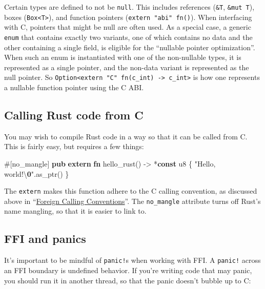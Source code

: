 \documentclass[a4paper,]{book}
\newenvironment{Shaded}{\begin{snugshade}}{\end{snugshade}}
\newcommand{\KeywordTok}[1]{\textcolor[rgb]{0.13,0.29,0.53}{\textbf{{#1}}}}
\newcommand{\DataTypeTok}[1]{\textcolor[rgb]{0.13,0.29,0.53}{{#1}}}
\newcommand{\SpecialCharTok}[1]{\textcolor[rgb]{0.00,0.00,0.00}{{#1}}}
\newcommand{\StringTok}[1]{\textcolor[rgb]{0.31,0.60,0.02}{{#1}}}
\newcommand{\AttributeTok}[1]{\textcolor[rgb]{0.77,0.63,0.00}{{#1}}}
\newcommand{\ErrorTok}[1]{\textcolor[rgb]{0.64,0.00,0.00}{\textbf{{#1}}}}
\newcommand{\NormalTok}[1]{{#1}}
\begin{document}
Certain types are defined to not be \texttt{null}. This includes
references (\texttt{\&T}, \texttt{\&mut\ T}), boxes
(\texttt{Box\textless{}T\textgreater{}}), and function pointers
(\texttt{extern\ "abi"\ fn()}). When interfacing with C, pointers that
might be null are often used. As a special case, a generic \texttt{enum}
that contains exactly two variants, one of which contains no data and
the other containing a single field, is eligible for the ``nullable
pointer optimization''. When such an enum is instantiated with one of
the non-nullable types, it is represented as a single pointer, and the
non-data variant is represented as the null pointer. So
\texttt{Option\textless{}extern\ "C"\ fn(c\_int)\ -\textgreater{}\ c\_int\textgreater{}}
is how one represents a nullable function pointer using the C ABI.

\subsection{Calling Rust code from C}\label{calling-rust-code-from-c}

You may wish to compile Rust code in a way so that it can be called from
C. This is fairly easy, but requires a few things:

\begin{Shaded}
\begin{Highlighting}[]
\AttributeTok{#[}\NormalTok{no_mangle}\AttributeTok{]}
\KeywordTok{pub} \KeywordTok{extern} \KeywordTok{fn} \NormalTok{hello_rust() -> *}\KeywordTok{const} \DataTypeTok{u8} \NormalTok{\{}
    \StringTok{"Hello, world!}\SpecialCharTok{\textbackslash{}}\ErrorTok{0}\StringTok{"}\NormalTok{.as_ptr()}
\NormalTok{\}}
\end{Highlighting}
\end{Shaded}

The \texttt{extern} makes this function adhere to the C calling
convention, as discussed above in
``\protect\hyperlink{foreign-calling-conventions}{Foreign Calling
Conventions}''. The \texttt{no\_mangle} attribute turns off Rust's name
mangling, so that it is easier to link to.

\subsection{FFI and panics}\label{ffi-and-panics}

It's important to be mindful of \texttt{panic!}s when working with FFI.
A \texttt{panic!} across an FFI boundary is undefined behavior. If
you're writing code that may panic, you should run it in another thread,
so that the panic doesn't bubble up to C:
\end{document}
